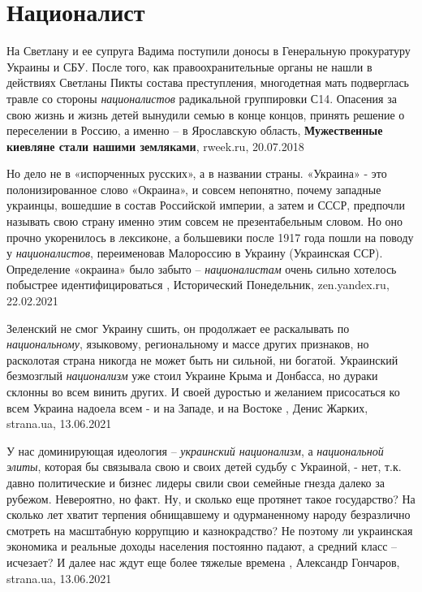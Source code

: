  
 
 
 
 
\chapter{Националист}

На Светлану и ее супруга Вадима поступили доносы в Генеральную прокуратуру
Украины и СБУ. После того, как правоохранительные органы не нашли в действиях
Светланы Пикты состава преступления, многодетная мать подверглась травле со
стороны \emph{националистов} радикальной группировки С14. Опасения за свою
жизнь и жизнь детей вынудили семью в конце концов, принять решение о
переселении в Россию, а именно – в Ярославскую область,
\textbf{Мужественные киевляне стали нашими земляками}, rweek.ru, 20.07.2018

Но дело не в «испорченных русских», а в названии страны. «Украина» - это
полонизированное слово «Окраина», и совсем непонятно, почему западные украинцы,
вошедшие в состав Российской империи, а затем и СССР, предпочли называть свою
страну именно этим совсем не презентабельным словом. Но оно прочно укоренилось
в лексиконе, а большевики после 1917 года пошли на поводу у \emph{националистов},
переименовав Малороссию в Украину (Украинская ССР). Определение «окраина» было
забыто – \emph{националистам} очень сильно хотелось побыстрее идентифицироваться
, 
Исторический Понедельник, zen.yandex.ru, 22.02.2021 

Зеленский не смог Украину сшить, он продолжает ее раскалывать по \emph{национальному},
языковому, региональному и массе других признаков, но расколотая страна никогда
не может быть ни сильной, ни богатой. Украинский безмозглый \emph{национализм}
уже стоил Украине Крыма и Донбасса, но дураки склонны во всем винить других. И
своей дуростью и желанием присосаться ко всем Украина надоела всем - и на
Западе, и на Востоке
, 
Денис Жарких, strana.ua, 13.06.2021

У нас доминирующая идеология – \emph{украинский национализм}, а \emph{национальной элиты},
которая бы связывала свою и своих детей судьбу с Украиной, - нет, т.к. давно
политические и бизнес лидеры свили свои семейные гнезда далеко за рубежом.
Невероятно, но факт.  Ну, и сколько еще протянет такое государство? На сколько
лет хватит терпения обнищавшему и одурманенному народу безразлично смотреть на
масштабную коррупцию и казнокрадство?  Не поэтому ли украинская экономика и
реальные доходы населения постоянно падают, а средний класс – исчезает? И далее
нас ждут еще более тяжелые времена
, 
Александр Гончаров, strana.ua, 13.06.2021

